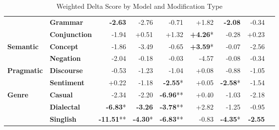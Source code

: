 \begin{table}[h]
{\begin{tabular}{llrrrrrrr}
  & \textbf{Grammar} & \cellcolor{red!7} \textbf{-2.63} & \cellcolor{red!8} -2.76 & \cellcolor{red!2} -0.71 & \cellcolor{green!5} +1.82 & \cellcolor{red!6} \textbf{-2.08} & \cellcolor{red!1} -0.34 \\
  & \textbf{Conjunction} & \cellcolor{red!5} -1.94 & \cellcolor{green!1} +0.51 & \cellcolor{green!3} +1.32 & \cellcolor{green!12} \textbf{+4.26}* & \cellcolor{red!0} -0.28 & \cellcolor{green!0} +0.23 \\
\hline
\textbf{Semantic} & \textbf{Concept} & \cellcolor{red!5} -1.86 & \cellcolor{red!10} -3.49 & \cellcolor{red!1} -0.65 & \cellcolor{green!10} \textbf{+3.59}* & \cellcolor{red!0} -0.07 & \cellcolor{red!7} -2.56 \\
  & \textbf{Negation} & \cellcolor{red!6} -2.04 & \cellcolor{red!0} -0.18 & \cellcolor{red!0} -0.03 & \cellcolor{red!13} -4.57 & \cellcolor{red!0} -0.08 & \cellcolor{red!1} -0.34 \\
\hline
\textbf{Pragmatic} & \textbf{Discourse} & \cellcolor{red!1} -0.53 & \cellcolor{red!3} -1.23 & \cellcolor{red!3} -1.04 & \cellcolor{green!0} +0.08 & \cellcolor{red!2} -0.88 & \cellcolor{red!3} -1.05 \\
  & \textbf{Sentiment} & \cellcolor{green!0} +0.22 & \cellcolor{red!3} -1.18 & \cellcolor{red!7} \textbf{-2.55}* & \cellcolor{green!0} +0.05 & \cellcolor{red!7} \textbf{-2.58}* & \cellcolor{red!4} -1.54 \\
\hline
\textbf{Genre} & \textbf{Casual} & \cellcolor{red!7} -2.34 & \cellcolor{red!6} -2.20 & \cellcolor{red!20} \textbf{-6.96}** & \cellcolor{green!1} +0.40 & \cellcolor{red!3} -1.03 & \cellcolor{red!6} -2.18 \\
  & \textbf{Dialectal} & \cellcolor{red!20} \textbf{-6.83}* & \cellcolor{red!9} \textbf{-3.26} & \cellcolor{red!11} \textbf{-3.78}** & \cellcolor{green!8} +2.82 & \cellcolor{red!3} -1.25 & \cellcolor{red!2} -0.95 \\
  & \textbf{Singlish} & \cellcolor{red!30} \textbf{-11.51}** & \cellcolor{red!12} \textbf{-4.30}* & \cellcolor{red!20} \textbf{-6.83}** & \cellcolor{red!2} -0.83 & \cellcolor{red!13} \textbf{-4.35}* & \cellcolor{red!7} \textbf{-2.55} \\
\hline
\end{tabular}}
\caption{Weighted Delta Score by Model and Modification Type}
\label{tab:ner_results}
\end{table}